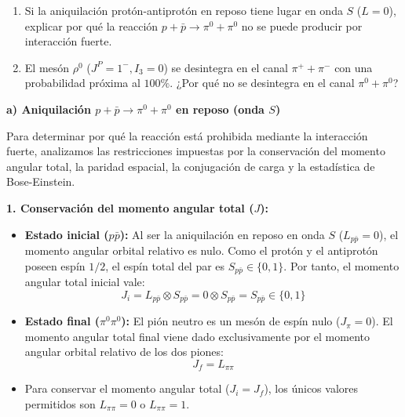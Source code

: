 \newpage
\begin{problema}
\begin{enumerate}[label=\alph*)]
    \item Si la aniquilación protón-antiprotón en reposo tiene lugar en onda $S$ ($L=0$), explicar por qué la reacción $p + \bar{p} \to \pi^0 + \pi^0$ no se puede producir por interacción fuerte.
    \item El mesón $\rho^0$ ($J^P=1^-, I_3=0$) se desintegra en el canal $\pi^+ + \pi^-$ con una probabilidad próxima al $100\%$. ¿Por qué no se desintegra en el canal $\pi^0 + \pi^0$?
\end{enumerate}
\tcblower
\textbf{a) Aniquilación $p + \bar{p} \to \pi^0 + \pi^0$ en reposo (onda $S$)}

Para determinar por qué la reacción está prohibida mediante la interacción fuerte, analizamos las restricciones impuestas por la conservación del momento angular total, la paridad espacial, la conjugación de carga y la estadística de Bose-Einstein.

\textbf{1. Conservación del momento angular total ($J$):}
\begin{itemize}
    \item \textbf{Estado inicial ($p\bar{p}$):} Al ser la aniquilación en reposo en onda $S$ ($L_{p\bar{p}} = 0$), el momento angular orbital relativo es nulo. Como el protón y el antiprotón poseen espín $1/2$, el espín total del par es $S_{p\bar{p}} \in \{0, 1\}$. Por tanto, el momento angular total inicial vale:
    \begin{equation*}
        J_i = L_{p\bar{p}} \otimes S_{p\bar{p}} = 0 \otimes S_{p\bar{p}} = S_{p\bar{p}} \in \{0, 1\}
    \end{equation*}
    \item \textbf{Estado final ($\pi^0\pi^0$):} El pión neutro es un mesón de espín nulo ($J_\pi = 0$). El momento angular total final viene dado exclusivamente por el momento angular orbital relativo de los dos piones:
    \begin{equation*}
        J_f = L_{\pi\pi}
    \end{equation*}
    \item Para conservar el momento angular total ($J_i = J_f$), los únicos valores permitidos son $L_{\pi\pi} = 0$ o $L_{\pi\pi} = 1$.
\end{itemize}


\end{problema}
